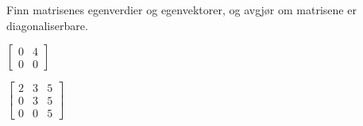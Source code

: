 \begin{oppgave}
Finn matrisenes egenverdier og egenvektorer, og avgjør om matrisene er diagonaliserbare. 
\begin{punkt}
$\begin{bmatrix}
0 & 4\\
0 & 0
\end{bmatrix}$
\end{punkt}
%
%
%
%

%
%
%
%
%

\begin{punkt}
$\begin{bmatrix}
2 & 3 & 5\\
0 & 3 & 5\\
0 & 0 & 5
\end{bmatrix}$
\end{punkt}


\end{oppgave}
